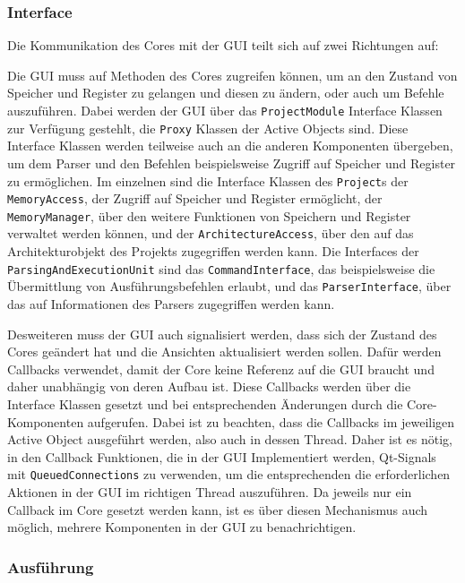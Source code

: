 \subsubsection{Interface}

Die Kommunikation des Cores mit der GUI teilt sich auf zwei Richtungen auf:

Die GUI muss auf Methoden des Cores zugreifen können, um an den Zustand von
Speicher und Register zu gelangen und diesen zu ändern, oder auch um Befehle
auszuführen. Dabei werden der GUI über das \texttt{ProjectModule} Interface
Klassen zur Verfügung gestehlt, die \texttt{Proxy} Klassen der Active Objects
sind. Diese Interface Klassen werden teilweise auch an die anderen Komponenten
übergeben, um dem Parser und den Befehlen beispielsweise Zugriff auf Speicher
und Register zu ermöglichen. Im einzelnen sind die Interface Klassen des
\texttt{Project}s der \texttt{MemoryAccess}, der Zugriff auf Speicher und
Register ermöglicht, der \texttt{MemoryManager}, über den weitere Funktionen von
Speichern und Register verwaltet werden können, und der
\texttt{ArchitectureAccess}, über den auf das Architekturobjekt des Projekts
zugegriffen werden kann. Die Interfaces der \texttt{ParsingAndExecutionUnit}
sind das \texttt{CommandInterface}, das beispielsweise die Übermittlung von
Ausführungsbefehlen erlaubt, und das \texttt{ParserInterface}, über das auf
Informationen des Parsers zugegriffen werden kann.

Desweiteren muss der GUI auch signalisiert werden, dass sich der Zustand des
Cores geändert hat und die Ansichten aktualisiert werden sollen. Dafür werden
Callbacks verwendet, damit der Core keine Referenz auf die GUI braucht und daher
unabhängig von deren Aufbau ist. Diese Callbacks werden über die Interface
Klassen gesetzt und bei entsprechenden Änderungen durch die Core-Komponenten
aufgerufen. Dabei ist zu beachten, dass die Callbacks im jeweiligen Active
Object ausgeführt werden, also auch in dessen Thread. Daher ist es nötig, in den
Callback Funktionen, die in der GUI Implementiert werden, Qt-Signals mit
\texttt{QueuedConnections} zu verwenden, um die entsprechenden die
erforderlichen Aktionen in der GUI im richtigen Thread auszuführen. Da jeweils
nur ein Callback im Core gesetzt werden kann, ist es über diesen Mechanismus
auch möglich, mehrere Komponenten in der GUI zu benachrichtigen.

\subsubsection{Ausführung}

